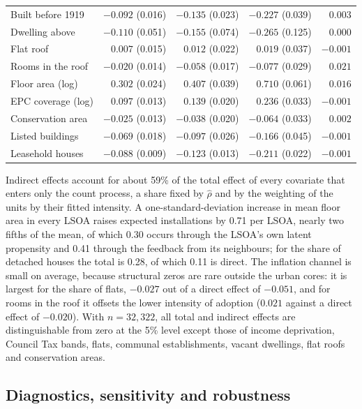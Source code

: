 \begin{table}[htbp]
\begin{tabular}{lrrrr}
Built before 1919          & $-0.092$ (0.016) & $-0.135$ (0.023) & $-0.227$ (0.039) & $0.003$ \\
Dwelling above             & $-0.110$ (0.051) & $-0.155$ (0.074) & $-0.265$ (0.125) & $0.000$ \\
Flat roof                  & $0.007$ (0.015) & $0.012$ (0.022) & $0.019$ (0.037) & $-0.001$ \\
Rooms in the roof          & $-0.020$ (0.014) & $-0.058$ (0.017) & $-0.077$ (0.029) & $0.021$ \\
Floor area (log)           & $0.302$ (0.024) & $0.407$ (0.039) & $0.710$ (0.061) & $0.016$ \\
EPC coverage (log)         & $0.097$ (0.013) & $0.139$ (0.020) & $0.236$ (0.033) & $-0.001$ \\
Conservation area          & $-0.025$ (0.013) & $-0.038$ (0.020) & $-0.064$ (0.033) & $0.002$ \\
Listed buildings           & $-0.069$ (0.018) & $-0.097$ (0.026) & $-0.166$ (0.045) & $-0.001$ \\
Leasehold houses           & $-0.088$ (0.009) & $-0.123$ (0.013) & $-0.211$ (0.022) & $-0.001$ \\
\bottomrule
\end{tabular}
\end{table}

Indirect effects account for about 59\% of the total effect of every covariate that enters only the count process, a share fixed by $\hat\rho$ and by the weighting of the units by their fitted intensity.
A one-standard-deviation increase in mean floor area in every LSOA raises expected installations by 0.71 per LSOA, nearly two fifths of the mean, of which 0.30 occurs through the LSOA's own latent propensity and 0.41 through the feedback from its neighbours; for the share of detached houses the total is 0.28, of which 0.11 is direct.
The inflation channel is small on average, because structural zeros are rare outside the urban cores: it is largest for the share of flats, $-0.027$ out of a direct effect of $-0.051$, and for rooms in the roof it offsets the lower intensity of adoption ($0.021$ against a direct effect of $-0.020$).
With $n = 32{,}322$, all total and indirect effects are distinguishable from zero at the 5\% level except those of income deprivation, Council Tax bands, flats, communal establishments, vacant dwellings, flat roofs and conservation areas.

\subsection{Diagnostics, sensitivity and robustness}\label{sec:app_diagnostics}


